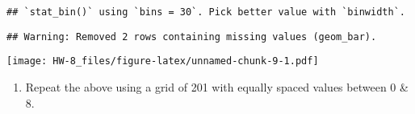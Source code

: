 \documentclass[
]{article}
\providecommand{\tightlist}{%
  \setlength{\itemsep}{0pt}\setlength{\parskip}{0pt}}
\begin{document}
\begin{verbatim}
## `stat_bin()` using `bins = 30`. Pick better value with `binwidth`.
\end{verbatim}

\begin{verbatim}
## Warning: Removed 2 rows containing missing values (geom_bar).
\end{verbatim}

\texttt{[image: HW-8\_files/figure-latex/unnamed-chunk-9-1.pdf]}

\begin{enumerate}
\def\labelenumi{\alph{enumi})}
\setcounter{enumi}{1}
\tightlist
\item
  Repeat the above using a grid of 201 with equally spaced values
  between 0 \& 8.
\end{enumerate}
\end{document}
